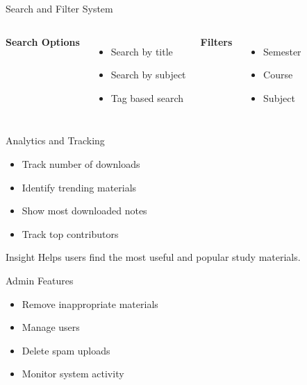 \documentclass{beamer}
\begin{document}

\begin{frame}{Search and Filter System}

\begin{columns}


\textbf{Search Options}

\begin{itemize}
\item Search by title
\item Search by subject
\item Tag based search
\end{itemize}


\textbf{Filters}

\begin{itemize}
\item Semester
\item Course
\item Subject
\end{itemize}

\end{columns}

\end{frame}




\begin{frame}{Analytics and Tracking}

\begin{itemize}
\item Track number of downloads
\item Identify trending materials
\item Show most downloaded notes
\item Track top contributors
\end{itemize}

\begin{exampleblock}{Insight}
Helps users find the most useful and popular study materials.
\end{exampleblock}

\end{frame}


\begin{frame}{Admin Features}

\begin{itemize}
\item Remove inappropriate materials
\item Manage users
\item Delete spam uploads
\item Monitor system activity
\end{itemize}

\end{frame}
\end{document}
